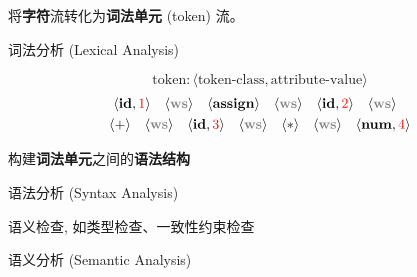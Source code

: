 \begin{frame}{}
  \begin{center}
     将{\bf 字符}流转化为{\bf 词法单元} (token) 流。
  \end{center}

  \begin{exampleblock}{词法分析 (Lexical Analysis)}
    \begin{center}
      \[
        \text{token}: \langle \text{token-class}, \text{attribute-value} \rangle
      \]
      \begin{align*}
        \langle \id, \red{1} \rangle \quad 
        \langle \ws \rangle \quad
        \langle \assign \rangle \quad
        \langle \ws \rangle \quad
        \langle \id, \red{2} \rangle \quad
        \langle \ws \rangle \quad \\
        \langle + \rangle \quad
        \langle \ws \rangle \quad
        \langle \id, \red{3} \rangle \quad
        \langle \ws \rangle \quad
        \langle \ast \rangle \quad
        \langle \ws \rangle \quad
        \langle \num, \red{4} \rangle
      \end{align*}
    \end{center}
  \end{exampleblock}
\end{frame}

\begin{frame}{}
  \begin{center}
     构建{\bf 词法单元}之间的{\bf 语法结构}
  \end{center}

  \begin{exampleblock}{语法分析 (Syntax Analysis)}
    \begin{center}
    \end{center}
  \end{exampleblock}
\end{frame}

\begin{frame}{}
  \begin{center}
     语义检查, 如类型检查、一致性约束检查
  \end{center}

  \begin{exampleblock}{语义分析 (Semantic Analysis)}
    \begin{center}
    \end{center}
  \end{exampleblock}
\end{frame}

